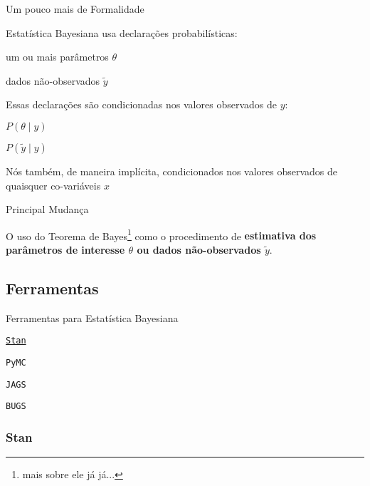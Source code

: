 \begin{frame}{Um pouco mais de Formalidade}
	\begin{vfilleditems}
		\item Estatística Bayesiana usa declarações probabilísticas:
		\begin{vfilleditems}
			\item um ou mais parâmetros $\theta$
			\item dados não-observados $\tilde{y}$
		\end{vfilleditems}
		\item Essas declarações são condicionadas nos valores observados de $y$:
		\begin{vfilleditems}
			\item $P(\theta \mid y)$
			\item $P(\tilde{y} \mid y)$
		\end{vfilleditems}
		\item Nós também, de maneira implícita, condicionados nos valores observados de quaisquer co-variáveis $x$
	\end{vfilleditems}
\end{frame}

\begin{frame}{Principal Mudança}
	\begin{defn}
		O uso do Teorema de Bayes\footnote{mais sobre ele já já...} como o procedimento de \textbf{estimativa dos parâmetros de interesse $\theta$ ou dados não-observados $\tilde{y}$}. \parencite{gelman2013bayesian}
	\end{defn}
\end{frame}

\subsection{Ferramentas}

\begin{frame}{Ferramentas para Estatística Bayesiana}
	\begin{vfilleditems}
		\item \LARGE  \href{https://mc-stan.org}{\texttt{Stan}}
		\item \texttt{PyMC}
		\item \small \texttt{JAGS}
		\item \footnotesize \texttt{BUGS}
	\end{vfilleditems}
\end{frame}

\subsubsection{Stan}

